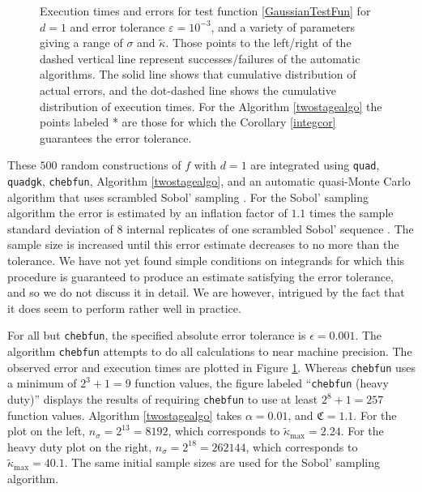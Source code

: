 \documentclass[graybox]{svmult}
\newcommand{\fudge}{\mathfrak{C}}
\newcommand{\tkappa}{\tilde{\kappa}}
\begin{document}
\begin{figure}
\caption{Execution times and errors for test function \eqref{GaussianTestFun} for $d=1$ and error tolerance $\varepsilon=10^{-3}$, and a variety of parameters giving a range of $\sigma$ and $\tkappa$. Those points to the left/right of the dashed 
vertical line 
represent successes/failures of the automatic algorithms.  The solid line shows that cumulative distribution of actual errors, and the dot-dashed line shows the cumulative distribution of execution times.  For the Algorithm \ref{twostagealgo} the points labeled * are those for which the Corollary \ref{integcor} guarantees the error tolerance.\label{GaussianTestFunFig} }
\end{figure}

These $500$ random constructions of $f$ with $d=1$ are integrated using {\tt quad},  {\tt quadgk}, {\tt chebfun}, Algorithm \ref{twostagealgo}, and an automatic quasi-Monte Carlo algorithm that uses scrambled Sobol' sampling \citep{Owe95,Owe96,Owe97,Mat98,HonHic00a,DicPil10a}.  For the Sobol' sampling algorithm the error is estimated by an inflation factor of $1.1$ times the sample standard deviation of $8$ internal replicates of one scrambled Sobol' sequence \citep{Owe06a}.  The sample size is increased until this error estimate decreases to no more than the tolerance.  We 
have not yet found simple conditions on integrands for which this procedure is guaranteed to produce an estimate satisfying the error tolerance, 
and so we do not discuss it in detail.  We are however, intrigued by the fact that it does seem to perform rather well in practice.

For all but {\tt chebfun}, the specified absolute error tolerance is $\epsilon=0.001$.  The algorithm {\tt chebfun} attempts to do all calculations to near machine precision.  The observed error and execution times are plotted in Figure \ref{GaussianTestFunFig}.  Whereas {\tt chebfun} uses a minimum of $2^3+1=9$ function values, the figure labeled ``{\tt chebfun} (heavy duty)'' displays the results of requiring {\tt chebfun} to use at least $2^{8}+1=257$ function values.  Algorithm \ref{twostagealgo} takes $\alpha=0.01$, and $\fudge=1.1$.  For the plot on the left, $n_\sigma=2^{13}=8192$, which corresponds to  $\tkappa_{\max}=2.24$.  For the heavy duty plot on the right, $n_\sigma=2^{18}=262144$, which corresponds to  $\tkappa_{\max}=40.1$.  The same initial sample sizes are used for the Sobol' sampling algorithm.
\end{document}
